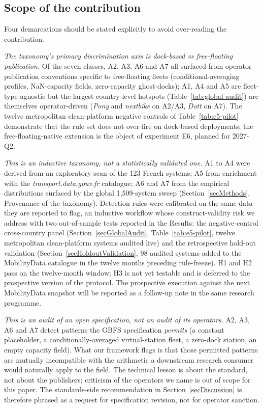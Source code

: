 \documentclass[11pt,a4paper]{article}
\begin{document}
\subsection{Scope of the contribution}
\label{secScope}
Four demarcations should be stated explicitly to avoid
over-reading the contribution.

\emph{The taxonomy's primary discrimination axis is dock-based vs
free-floating publication.} Of the seven classes, A2, A3, A6 and A7
all surfaced from operator publication conventions specific to
free-floating fleets (conditional-averaging profiles, NaN-capacity
fields, zero-capacity ghost-docks); A1, A4 and A5 are
fleet-type-agnostic but the largest country-level hotspots
(Table~\ref{tab:global-audit}) are themselves operator-driven (\emph{Pony}
and \emph{nextbike} on A2/A3, \emph{Dott} on A7). The twelve
metropolitan clean-platform negative controls of
Table~\ref{tab:e5-pilot} demonstrate that the rule set does not
over-fire on dock-based deployments; the free-floating-native
extension is the object of experiment E6, planned for 2027-Q2.

\emph{This is an inductive taxonomy, not a statistically
validated one.} A1 to A4 were derived from an exploratory scan of
the 123 French systems; A5 from enrichment with the
\emph{transport.data.gouv.fr} catalogue; A6 and A7 from the
empirical distributions surfaced by the global 1{,}509-system
sweep (Section~\ref{secMethods}, Provenance of the taxonomy).
Detection rules were calibrated on the same data they are reported
to flag, an inductive workflow whose construct-validity risk we
address with two out-of-sample tests reported in the Results:
the negative-control cross-country panel
(Section~\ref{secGlobalAudit}, Table~\ref{tab:e5-pilot}, twelve
metropolitan clean-platform systems audited live) and the
retrospective hold-out validation
(Section~\ref{secHoldoutValidation}, 98 audited systems added to
the MobilityData catalogue in the twelve months preceding
rule-freeze). H1 and H2 pass on the twelve-month window; H3 is
not yet testable and is deferred to the prospective version of
the protocol. The prospective execution against the next
MobilityData snapshot will be reported as a follow-up note in
the same research programme.

\emph{This is an audit of an open specification, not an audit of
its operators.} A2, A3, A6 and A7 detect patterns the GBFS
specification \emph{permits} (a constant placeholder, a
conditionally-averaged virtual-station fleet, a zero-dock
station, an empty capacity field). What our framework flags is
that those permitted patterns are mutually incompatible with the
arithmetic a downstream research consumer would naturally apply
to the field. The technical lesson is about the standard, not
about the publishers; criticism of the operators we name is out
of scope for this paper. The standards-side recommendation in
Section~\ref{secDiscussion} is therefore phrased as a request for
specification revision, not for operator sanction.
\end{document}
